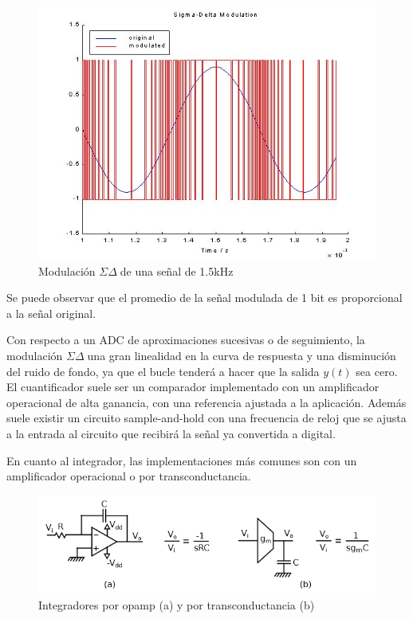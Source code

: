 \documentclass[12pt]{report} %
\newcommand{\sigmadelta}{$\Sigma\Delta\; $}
\begin{document}
	\begin{figure}[H]
		\includegraphics[width=\textwidth]{sd-modulation-example.jpg}
		\caption[Modulación \sigmadelta de una señal de 1.5kHz]{Modulación \sigmadelta de una señal de 1.5kHz\protect\footnotemark}
		\label{fig:sd-modulation-example.jpg}
	\end{figure}

	
	Se puede observar que el promedio de la señal modulada de 1 bit es proporcional a la señal original.
	
	Con respecto a un ADC de aproximaciones sucesivas o de seguimiento, la modulación \sigmadelta una gran linealidad en la curva de respuesta y una disminución del ruido de fondo, ya que el bucle tenderá a hacer que la salida $y(t)$ sea cero. El cuantificador suele ser un comparador implementado con un amplificador operacional de alta ganancia, con una referencia ajustada a la aplicación. Además suele existir un circuito sample-and-hold con una frecuencia de reloj que se ajusta a la entrada al circuito que recibirá la señal ya convertida a digital.
	
	En cuanto al integrador, las implementaciones más comunes son con un amplificador operacional o por transconductancia.
	
	\begin{figure}[H]
		\includegraphics[width=\textwidth]{integrator-opamp-trans.png}
		\caption[Integradores por opamp (a) y por transconductancia (b)]{Integradores por opamp (a) y por transconductancia (b)\protect\footnotemark}
		\label{fig:integrator-opamp-trans.png}
	\end{figure}
	
\end{document}
